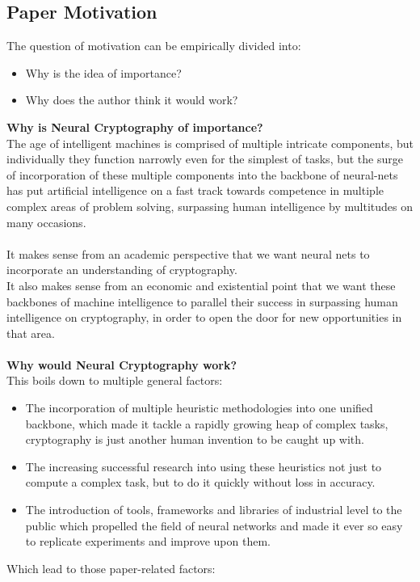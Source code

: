 \documentclass[12pt]{article}
\begin{document}
\subsection{\textbf{Paper Motivation}}
The question of motivation can be empirically divided into:
\begin{itemize}
	\item Why is the idea of importance?
	\item Why does the author think it would work?
\end{itemize}
\textbf{Why is Neural Cryptography of importance?}\\
The age of intelligent machines is comprised of multiple intricate components, but individually they function narrowly even for the simplest of tasks, but the surge of incorporation of these multiple components into the backbone of neural-nets has put artificial intelligence on a fast track towards competence in multiple complex areas of problem solving, surpassing human intelligence by multitudes on many occasions.\\\\
It makes sense from an academic perspective that we want neural nets to incorporate an understanding of cryptography.\\
It also makes sense from an economic and existential point that we want these backbones of machine intelligence to parallel their success in surpassing human intelligence on cryptography, in order to open the door for new opportunities in that area.\\\\
\textbf{Why would Neural Cryptography work?}\\
This boils down to multiple general factors:
\begin{itemize}
	\item The incorporation of multiple heuristic methodologies into one unified backbone, which made it tackle a rapidly growing heap of complex tasks, cryptography is just another human invention to be caught up with.
	\item The increasing successful research into using these heuristics not just to compute a complex task, but to do it quickly without loss in accuracy.
	\item The introduction of tools, frameworks and libraries of industrial level to the public which propelled the field of neural networks and made it ever so easy to replicate experiments and improve upon them.
\end{itemize}
Which lead to those paper-related factors:
\end{document}
